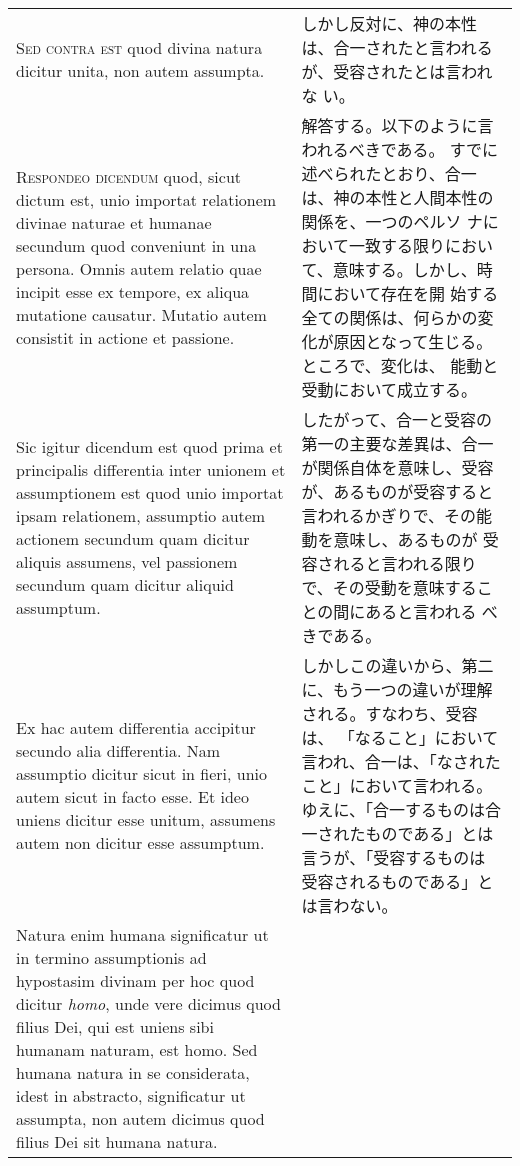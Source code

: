 \documentclass[10pt]{jsarticle} %
\begin{document}
\begin{longtable}{p{21em}p{21em}}
{\scshape Sed contra est} quod divina natura dicitur unita, non autem assumpta.


&

しかし反対に、神の本性は、合一されたと言われるが、受容されたとは言われな
 い。

\\



{\scshape Respondeo dicendum} quod, sicut dictum est, unio importat relationem
divinae naturae et humanae secundum quod conveniunt in una
persona. Omnis autem relatio quae incipit esse ex tempore, ex aliqua
mutatione causatur. Mutatio autem consistit in actione et passione. 


&

解答する。以下のように言われるべきである。
すでに述べられたとおり、合一は、神の本性と人間本性の関係を、一つのペルソ
 ナにおいて一致する限りにおいて、意味する。しかし、時間において存在を開
 始する全ての関係は、何らかの変化が原因となって生じる。ところで、変化は、
 能動と受動において成立する。


\\

Sic
igitur dicendum est quod prima et principalis differentia inter unionem
et assumptionem est quod unio importat ipsam relationem, assumptio autem
actionem secundum quam dicitur aliquis assumens, vel passionem secundum
quam dicitur aliquid assumptum. 


&

したがって、合一と受容の第一の主要な差異は、合一が関係自体を意味し、受容
 が、あるものが受容すると言われるかぎりで、その能動を意味し、あるものが
 受容されると言われる限りで、その受動を意味することの間にあると言われる
 べきである。


\\

Ex hac autem differentia accipitur
secundo alia differentia. Nam assumptio dicitur sicut in fieri, unio
autem sicut in facto esse. Et ideo uniens dicitur esse unitum, assumens
autem non dicitur esse assumptum. 


&

しかしこの違いから、第二に、もう一つの違いが理解される。すなわち、受容は、
 「なること」において言われ、合一は、「なされたこと」において言われる。
ゆえに、「合一するものは合一されたものである」とは言うが、「受容するものは
 受容されるものである」とは言わない。


\\

Natura enim humana significatur ut in
termino assumptionis ad hypostasim divinam per hoc quod dicitur {\itshape homo},
unde vere dicimus quod filius Dei, qui est uniens sibi humanam naturam,
est homo. Sed humana natura in se considerata, idest in abstracto,
significatur ut assumpta, non autem dicimus quod filius Dei sit humana
natura. 



\end{longtable}
\end{document}
